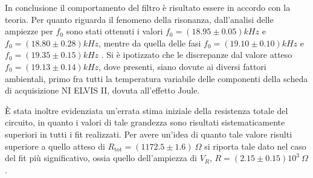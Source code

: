 

In conclusione il comportamento del filtro è risultato essere in accordo con la teoria.
Per quanto riguarda il fenomeno della risonanza, dall'analisi delle ampiezze per $f_0$ sono stati
ottenuti i valori $f_0 = (18.95 \pm 0.05) kHz$ e $f_0 = (18.80 \pm 0.28)kHz$, mentre
da quella delle fasi $f_0 = (19.10 \pm 0.10)kHz$ e $f_0 = (19.35 \pm 0.15)kHz$ .
Si è ipotizzato che le discrepanze dal valore atteso  $f_0 = (19.13 \pm 0.14) kHz$, dove presenti, siano dovute ai diversi fattori ambientali, primo fra tutti la temperatura
variabile delle componenti della scheda di acquisizione NI ELVIS II, dovuta all’effetto Joule.

È stata inoltre evidenziata un'errata stima iniziale della resistenza totale del circuito, in quanto i valori di tale
grandezza sono risultati sistematicamente superiori in tutti i fit realizzati.
Per avere un'idea di quanto tale valore risulti
superiore a quello atteso di $R_{\text{tot}} = (1172.5 \pm 1.6) \ \Omega$ si riporta tale dato
nel caso del fit più significativo, ossia quello dell'ampiezza di $V_R$, $R =( 2.15 \pm 0.15 )10^3 \ \Omega$.
